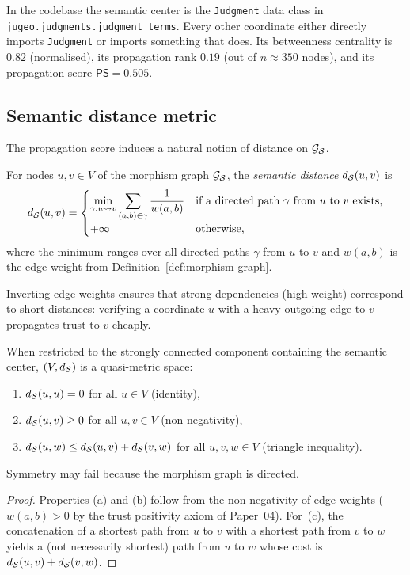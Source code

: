 \documentclass[11pt]{article}
\newcommand{\MG}{\mathcal{G}_{\Site}}       %
\newcommand{\PropScore}{\mathsf{PS}}        %
\newcommand{\wt}{w}                         %
\begin{document}
\begin{example}
In the \JuGeo{} codebase the semantic center is the
\texttt{Judgment} data class in
\texttt{jugeo.judgments.judgment\_terms}.  Every other coordinate either
directly imports \texttt{Judgment} or imports something that does.
Its betweenness centrality is $0.82$ (normalised), its propagation rank
$0.19$ (out of $n \approx 350$ nodes), and its propagation score
$\PropScore = 0.505$.
\end{example}

\subsection{Semantic distance metric}\label{sec:distance-metric}

The propagation score induces a natural notion of distance on $\MG$.

\begin{definition}\label{def:semantic-distance}
For nodes $u, v \in V$ of the morphism graph $\MG$, the
\emph{semantic distance} $d_{\mathcal{S}}(u, v)$ is
\[
  d_{\Site}(u, v) =
  \begin{cases}
    \displaystyle\min_{\gamma : u \leadsto v}
    \sum_{(a,b) \in \gamma} \frac{1}{\wt(a,b)} &
      \text{if a directed path $\gamma$ from $u$ to $v$ exists,} \\[6pt]
    +\infty & \text{otherwise,}
  \end{cases}
\]
where the minimum ranges over all directed paths $\gamma$ from $u$ to
$v$ and $\wt(a,b)$ is the edge weight from Definition~\ref{def:morphism-graph}.
\end{definition}

\noindent
Inverting edge weights ensures that strong dependencies (high weight)
correspond to short distances: verifying a coordinate $u$ with a
heavy outgoing edge to $v$ propagates trust to $v$ cheaply.

\begin{proposition}\label{prop:metric}
When restricted to the strongly connected component containing the
semantic center, $(V, d_{\mathcal{S}})$ is a quasi-metric space:
\begin{enumerate}[label=(\alph*),noitemsep]
  \item $d_{\mathcal{S}}(u,u) = 0$ for all $u \in V$ (identity),
  \item $d_{\mathcal{S}}(u,v) \geq 0$ for all $u,v \in V$ (non-negativity),
  \item $d_{\mathcal{S}}(u,w) \leq d_{\mathcal{S}}(u,v) + d_{\mathcal{S}}(v,w)$ for all
        $u,v,w \in V$ (triangle inequality).
\end{enumerate}
Symmetry may fail because the morphism graph is directed.
\end{proposition}
\begin{proof}
Properties (a) and (b) follow from the non-negativity of edge weights
($\wt(a,b) > 0$ by the trust positivity axiom of Paper~04).  For~(c),
the concatenation of a shortest path from $u$ to $v$ with a shortest
path from $v$ to $w$ yields a (not necessarily shortest) path from $u$
to $w$ whose cost is $d_{\mathcal{S}}(u,v) + d_{\mathcal{S}}(v,w)$.
\end{proof}
\end{document}
